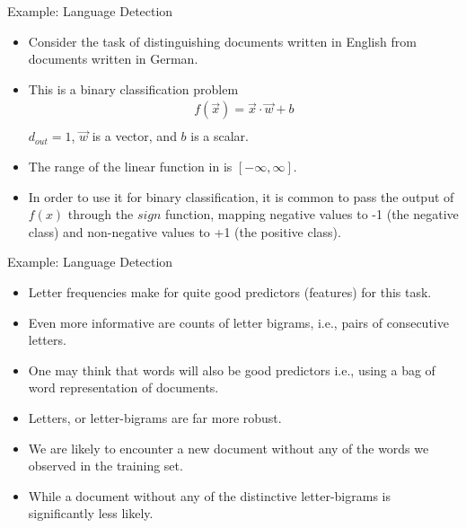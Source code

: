 \documentclass[handout]{beamer}
\begin{document}
\begin{frame}{Example: Language Detection}
\begin{scriptsize}
\begin{itemize}
\item Consider the task of distinguishing documents written in English from documents written in German.
\item This is a binary classification problem 
\begin{equation}
\begin{split}
f(\vec{x}) = \vec{x} \cdot \vec{w} + b\\
\end{split}
\end{equation}
 $d_{out}=1$, $\vec{w}$ is a vector, and $b$ is a scalar. 

 \item The range of the linear function in is $[-\infty,\infty]$.
 \item In order to use it for binary classification, it is common to pass the output of $f(x)$ through the $sign$ function, mapping negative values to -1 (the negative class) and non-negative values to +1 (the positive class).
\end{itemize}


\end{scriptsize}
\end{frame}


\begin{frame}{Example: Language Detection}
\begin{scriptsize}
\begin{itemize}

\item Letter frequencies make for quite good predictors (features) for this task.
\item Even more informative are counts of letter bigrams, i.e., pairs of consecutive letters.
\item One may think that words will also be good predictors i.e., using a bag of word representation of documents.
\item Letters, or letter-bigrams are far more robust.
\item We are likely to encounter a new document without any of the words we observed in the training set.
\item While a document without any of the distinctive letter-bigrams is significantly less likely. \cite{goldberg2017neural}
\end{itemize}


\end{scriptsize}
\end{frame}
\end{document}
